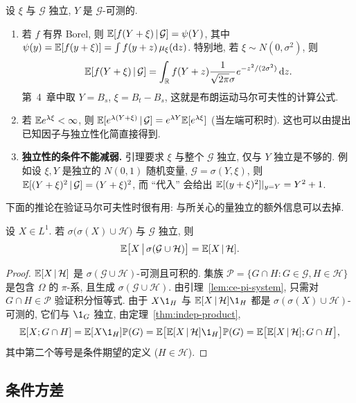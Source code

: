 \begin{example}\label{ex:freezing}
设 $\xi$ 与 $\mathcal{G}$ 独立, $Y$ 是 $\mathcal{G}$-可测的.
\begin{enumerate}
\item 若 $f$ 有界 Borel, 则 $\mathbb{E}[f(Y+\xi)\,|\,\mathcal{G}]=\psi(Y)$, 其中 $\psi(y)=\mathbb{E}[f(y+\xi)]=\int f(y+z)\,\mu_\xi(\mathop{}\!\mathrm{d} z)$. 特别地, 若 $\xi\sim N(0,\sigma^2)$, 则
\[
\mathbb{E}[f(Y+\xi)\,|\,\mathcal{G}]=\int_{\mathbb{R}}f(Y+z)\frac{1}{\sqrt{2\pi}\sigma}e^{-z^2/(2\sigma^2)}\mathop{}\!\mathrm{d} z.
\]
第~4~章中取 $Y=B_s$, $\xi=B_t-B_s$, 这就是布朗运动马尔可夫性的计算公式.
\item 若 $\mathbb{E} e^{\lambda\xi}<\infty$, 则 $\mathbb{E}[e^{\lambda(Y+\xi)}\,|\,\mathcal{G}]=e^{\lambda Y}\mathbb{E}[e^{\lambda\xi}]$ (当左端可积时). 这也可以由提出已知因子与独立性化简直接得到.
\item \textbf{独立性的条件不能减弱.} 引理要求 $\xi$ 与整个 $\mathcal{G}$ 独立, 仅与 $Y$ 独立是不够的. 例如设 $\xi,Y$ 是独立的 $N(0,1)$ 随机变量, $\mathcal{G}=\sigma(Y,\xi)$, 则 $\mathbb{E}[(Y+\xi)^2\,|\,\mathcal{G}]=(Y+\xi)^2$, 而 ``代入'' 会给出 $\mathbb{E}[(y+\xi)^2]|_{y=Y}=Y^2+1$.
\end{enumerate}
\end{example}

下面的推论在验证马尔可夫性时很有用: 与所关心的量独立的额外信息可以去掉.

\begin{proposition}[去掉独立的信息]\label{prop:drop-independent}
设 $X\in L^1$. 若 $\sigma\big(\sigma(X)\cup\mathcal{H}\big)$ 与 $\mathcal{G}$ 独立, 则
\[
\mathbb{E}\big[X\,\big|\,\sigma(\mathcal{G}\cup\mathcal{H})\big]=\mathbb{E}[X\,|\,\mathcal{H}].
\]
\end{proposition}

\begin{proof}
$\mathbb{E}[X\,|\,\mathcal{H}]$ 是 $\sigma(\mathcal{G}\cup\mathcal{H})$-可测且可积的. 集族 $\mathcal{P}=\{G\cap H: G\in\mathcal{G},H\in\mathcal{H}\}$ 是包含 $\Omega$ 的 $\pi$-系, 且生成 $\sigma(\mathcal{G}\cup\mathcal{H})$. 由引理~\ref{lem:ce-pi-system}, 只需对 $G\cap H\in\mathcal{P}$ 验证积分恒等式. 由于 $X\1_H$ 与 $\E[X\,|\,\mathcal{H}]\1_H$ 都是 $\sigma(\sigma(X)\cup\mathcal{H})$-可测的, 它们与 $\1_G$ 独立, 由定理~\ref{thm:indep-product},
\[
\E[X;G\cap H]=\E[X\1_H]\P(G)=\E\big[\E[X\,|\,\mathcal{H}]\1_H\big]\P(G)=\E\big[\E[X\,|\,\mathcal{H}];G\cap H\big],
\]
其中第二个等号是条件期望的定义 ($H\in\mathcal{H}$).
\end{proof}

\subsection{条件方差}

